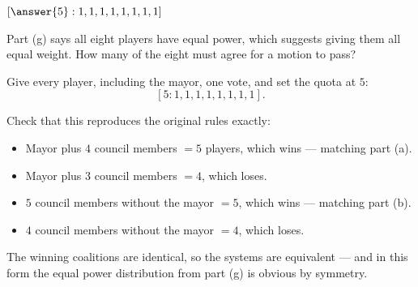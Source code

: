 \documentclass[12pt]{ximera}
\begin{document}
\begin{problem}
\begin{prompt}
$[\answer{5} : 1,1,1,1,1,1,1,1]$

\begin{hint}
Part (g) says all eight players have equal power, which suggests giving them all equal
weight. How many of the eight must agree for a motion to pass?
\end{hint}

\begin{feedback}
Give every player, including the mayor, one vote, and set the quota at $5$:
\[ [5:1,1,1,1,1,1,1,1]. \]

Check that this reproduces the original rules exactly:
\begin{itemize}
\item Mayor plus $4$ council members $= 5$ players, which wins --- matching part (a).
\item Mayor plus $3$ council members $= 4$, which loses. \checkmark
\item $5$ council members without the mayor $= 5$, which wins --- matching part (b).
\item $4$ council members without the mayor $= 4$, which loses. \checkmark
\end{itemize}
The winning coalitions are identical, so the systems are equivalent --- and in this
form the equal power distribution from part (g) is obvious by symmetry.
\end{feedback}
\end{prompt}
\end{problem}
\end{document}

